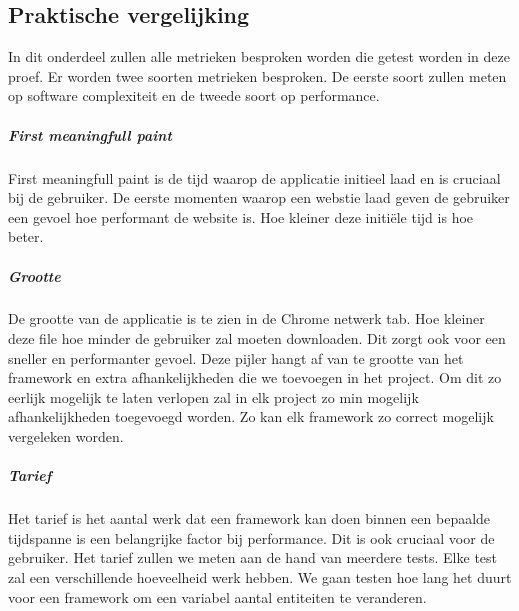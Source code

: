 \subsection{Praktische vergelijking}
\label{sec:Praktische_Vergelijking}
In dit onderdeel zullen alle metrieken besproken worden die getest worden in deze proef. Er worden twee soorten metrieken besproken. De eerste soort zullen meten op software complexiteit en de tweede soort op performance.

\subparagraph{First meaningfull paint}
First meaningfull paint is de tijd waarop de applicatie initieel laad en is cruciaal bij de gebruiker. De eerste momenten waarop een webstie laad geven de gebruiker een gevoel hoe performant de website is. Hoe kleiner deze initiële tijd is hoe beter.

\subparagraph{Grootte}
De grootte van de applicatie is te zien in de Chrome netwerk tab. Hoe kleiner deze file hoe minder de gebruiker zal moeten downloaden. Dit zorgt ook voor een sneller en performanter gevoel. Deze pijler hangt af van te grootte van het framework en extra afhankelijkheden die we toevoegen in het project. Om dit zo eerlijk mogelijk te laten verlopen zal in elk project zo min mogelijk afhankelijkheden toegevoegd worden. Zo kan elk framework zo correct mogelijk vergeleken worden.

\subparagraph{Tarief}
Het tarief is het aantal werk dat een framework kan doen binnen een bepaalde tijdspanne is een belangrijke factor bij performance. Dit is ook cruciaal voor de gebruiker. Het tarief zullen we meten aan de hand van meerdere tests. Elke test zal een verschillende hoeveelheid werk hebben. We gaan testen hoe lang het duurt voor een framework om een variabel aantal entiteiten te veranderen.








